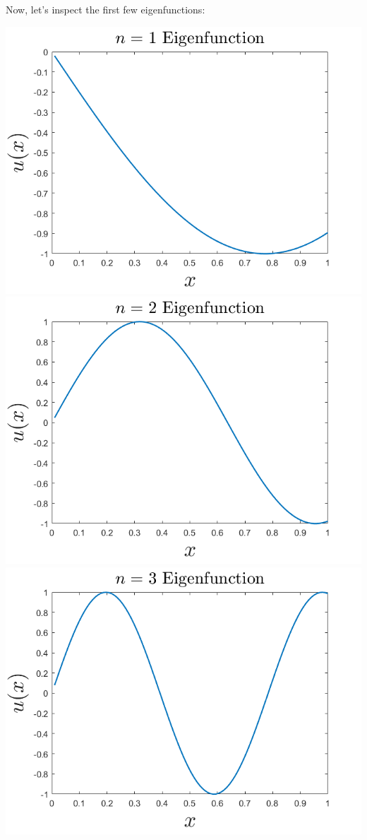 \documentclass{article}
\begin{document}
\begin{enumerate}
    Now, let's inspect the first few eigenfunctions:
    
    \begin{center}
        \includegraphics[scale = 0.4]{1beig1.png}
        \includegraphics[scale = 0.4]{1beig2.png}
        \newline
        \includegraphics[scale = 0.4]{1beig3.png}

\end{center}
\end{enumerate}
\end{document}
